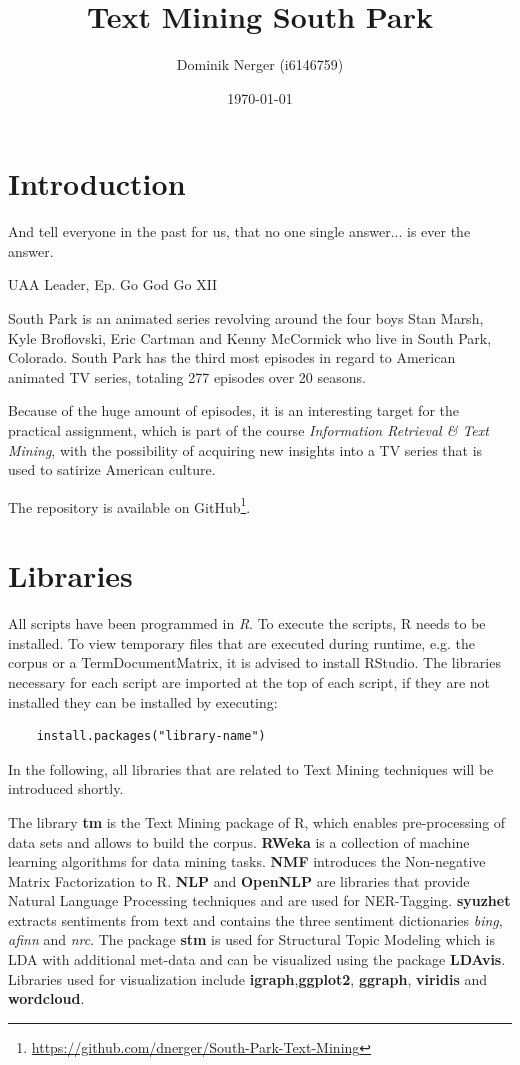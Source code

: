 \documentclass[10pt,a4paper]{article}
\author{Dominik Nerger (i6146759)}
\title{Text Mining South Park}
\date{\today}
\begin{document}
	\maketitle
	
	\tableofcontents
	\newpage
	\section{Introduction}
	\epigraph{ And tell everyone in the past for us, that no one single answer... is ever the answer. }{UAA Leader, Ep. Go God Go XII}

	South Park is an animated series revolving around the four boys Stan Marsh, Kyle Broflovski, Eric Cartman and Kenny McCormick who live in South Park, Colorado. South Park has the third most episodes in regard to American animated TV series, totaling 277 episodes over 20 seasons. 
	
	Because of the huge amount of episodes, it is an interesting target for the practical assignment, which is part of the course \textit{Information Retrieval \& Text Mining}, with the possibility of acquiring new insights into a TV series that is used to satirize American culture. 
	
	
	
	The repository is available on GitHub\footnote{\url{https://github.com/dnerger/South-Park-Text-Mining}}.
	\section{Libraries}
	
	All scripts have been programmed in \textit{R}. To execute the scripts, R needs to be installed. To view temporary files that are executed during runtime, e.g. the corpus or a TermDocumentMatrix, it is advised to install RStudio. The libraries necessary for each script are imported at the top of each script, if they are not installed they can be installed by executing:
	
	\begin{verbatim}
	install.packages("library-name")
	\end{verbatim}
	
	In the following, all libraries that are related to Text Mining techniques will be introduced shortly.
	
	The library \textbf{tm} is the Text Mining package of R, which enables pre-processing of data sets and allows to build the corpus. \textbf{RWeka} is a collection of machine learning algorithms for data mining tasks. \textbf{NMF} introduces the Non-negative Matrix Factorization to R.
	\textbf{NLP} and \textbf{OpenNLP} are libraries that provide Natural Language Processing techniques and are used for NER-Tagging. \textbf{syuzhet} extracts sentiments from text and contains the three sentiment dictionaries \textit{bing}, \textit{afinn} and \textit{nrc}.
	The package \textbf{stm} is used for Structural Topic Modeling  which is LDA with additional met-data and can be visualized using the package \textbf{LDAvis}.
	Libraries used for visualization include \textbf{igraph},\textbf{ggplot2}, \textbf{ggraph}, \textbf{viridis} and \textbf{wordcloud}.
	
\end{document}
